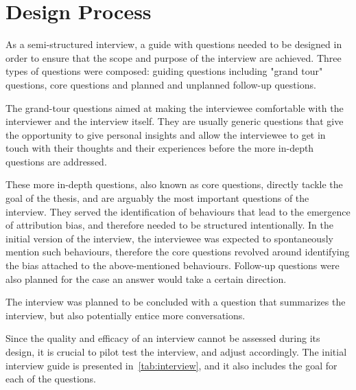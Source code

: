 \section{Design Process}\label{DesignProcess}

As a semi-structured interview, a guide with questions needed to be designed in order to ensure that the scope and purpose of the interview are achieved. Three types of questions were composed: guiding questions including "grand tour" questions, core questions and planned and unplanned follow-up questions.

The grand-tour questions aimed at making the interviewee comfortable with the interviewer and the interview itself. They are usually generic questions that give the opportunity to give personal insights and allow the interviewee to get in touch with their thoughts and their experiences before the more in-depth questions are addressed. 

These more in-depth questions, also known as core questions, directly tackle the goal of the thesis, and are arguably the most important questions of the interview. They served the identification of behaviours that lead to the emergence of attribution bias, and therefore needed to be structured intentionally. In the initial version of the interview, the interviewee was expected to spontaneously mention such behaviours, therefore the core questions revolved around identifying the bias attached to the above-mentioned behaviours. Follow-up questions were also planned for the case an answer would take a certain direction. 

The interview was planned to be concluded with a question that summarizes the interview, but also potentially entice more conversations. 

Since the quality and efficacy of an interview cannot be assessed during its design, it is crucial to pilot test the interview, and adjust accordingly. The initial interview guide is presented in~\autoref{tab:interview}, and it also includes the goal for each of the questions.


